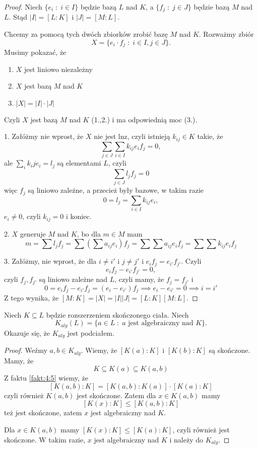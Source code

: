 \begin{proof}

Niech $\{e_i\;:\;i\in I\}$ będzie bazą $L$ nad $K$, a $\{f_j\;:\;j\in J\}$ będzie bazą $M$ nad $L$. Stąd $|I|=[L:K]$ i $|J|=[M:L]$.

Chcemy za pomocą tych dwóch zbiorków zrobić bazę $M$ nad $K$. Rozważmy zbiór
$$X=\{e_i\cdot f_j\;:\;i\in I,j\in J\}.$$
Musimy pokazać, że 
\begin{enumerate}
    \item $X$ jest liniowo niezależny
    \item $X$ jest bazą $M$ nad $K$
    \item $|X|=|I|\cdot|J|$
\end{enumerate}

Czyli $X$ jest bazą $M$ nad $K$ (1.,2.) i ma odpowiednią moc (3.).

1. Załóżmy nie wprost, że $X$ nie jest lnz, czyli istnieją $k_{ij}\in K$ takie, że
$$\sum\limits_{j\in J}\sum\limits_{i\in I}k_{ij}e_if_j=0,$$
ale $\sum\limits_ik_ije_i=l_j$ są elementami $L$, czyli
$$\sum\limits_{j\in J}l_jf_j=0$$
więc $f_j$ są liniowo zależne, a przecież były bazowe, w takim razie
$$0=l_j=\sum\limits_{i\in I}k_{ij}e_i,$$
$e_i\neq0$, czyli $k_{ij}=0$ i koniec.

2. $X$ generuje $M$ nad $K$, bo dla $m\in M$ mam
$$m=\sum l_jf_j=\sum\left(\sum a_{ij}e_i\right)f_j=\sum\sum a_{ij}e_if_j=\sum \sum k_{ij}e_if_j$$

3. Załóżmy, nie wprost, że dla $i\neq i'$ i $j\neq j'$ i $e_if_j=e_{i'}f_{j'}$. Czyli
$$e_if_j-e_{i'}f_{j'}=0,$$
czyli $f_j,f_{j'}$ są liniowo zależne nad $L$, czyli mamy, że $f_j=f_{j'}$ i
$$0=e_if_j-e_{i'}f_{j}=(e_i-e_{i'})f_j\implies e_i-e_{i'}=0\implies i=i'$$
Z tego wynika, że $[M:K]=|X|=|I||J|=[L:K][M:L]$.
\end{proof}
\begin{conclusion}
    Niech $K\subseteq L$ będzie rozszerzeniem skończonego ciała. Niech 
    $$K_{alg}(L)=\{a\in L\;:\;a\text{ jest algebraiczny nad }K\}.$$
    Okazuje się, że $K_{alg}$ jest podciałem.
\end{conclusion}

\begin{proof}

Weźmy $a,b\in K_{alg}$. Wiemy, że $[K(a):K]$ i $[K(b):K]$ są skończone. Mamy, że
$$K\subseteq K(a)\subseteq K(a, b)$$
Z faktu \ref{fakt:4:5} wiemy, że 
$$[K(a, b):K]=[K(a,b):K(a)]\cdot[K(a):K]$$
czyli również $K(a,b)$ jest skończone. Zatem dla $x\in K(a,b)$ mamy
$$[K(x):K]\leq[K(a,b):K]$$
też jest skończone, zatem $x$ jest algebraiczny nad $K$.
\medskip

Dla $x\in K(a, b)$ mamy $[K(x):K]\leq[K(a):K]$, czyli również jest skończone. W takim razie, $x$ jest algebraiczny nad $K$ i należy do $K_{alg}$.
\end{proof}

